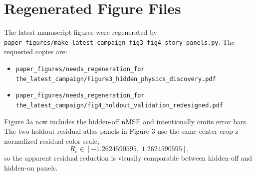 \documentclass[11pt]{article}
\begin{document}
\section{Regenerated Figure Files}

The latest manuscript figures were regenerated by
\texttt{paper\_figures/make\_latest\_campaign\_fig3\_fig4\_story\_panels.py}.
The requested copies are:
\begin{itemize}[leftmargin=*]
  \item \texttt{paper\_figures/needs\_regeneration\_for the\_latest\_campaign/Figure3\_hidden\_physics\_discovery.pdf}
  \item \texttt{paper\_figures/needs\_regeneration\_for the\_latest\_campaign/fig4\_holdout\_validation\_redesigned.pdf}
\end{itemize}
Figure 3a now includes the hidden-off nMSE and intentionally omits error bars.
The two holdout residual atlas panels in Figure 3 use the same center-crop
z-normalized residual color scale,
\[
  R_c \in [-1.2624590595,\;1.2624590595],
\]
so the apparent residual reduction is visually comparable between hidden-off
and hidden-on panels.
\end{document}
